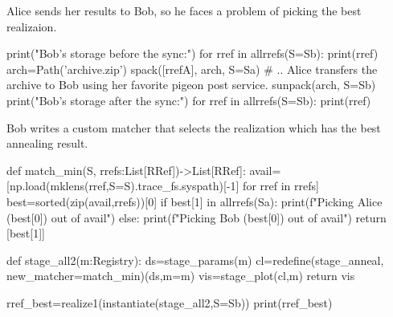 Alice sends her results to Bob, so he faces a problem of picking the best
realizaion.

\begin{pythontexcode}
print("Bob's storage before the sync:")
for rref in allrrefs(S=Sb):
  print(rref)
arch=Path('archive.zip')
spack([rrefA], arch, S=Sa)
# .. Alice transfers the archive to Bob using her favorite pigeon post service.
sunpack(arch, S=Sb)
print("Bob's storage after the sync:")
for rref in allrrefs(S=Sb):
  print(rref)
\end{pythontexcode}

\mystdout


Bob writes a custom matcher that selects the realization which has the best
annealing result.

\begin{pythontexcode}
def match_min(S, rrefs:List[RRef])->List[RRef]:
  avail=[np.load(mklens(rref,S=S).trace_fs.syspath)[-1] for rref in rrefs]
  best=sorted(zip(avail,rrefs))[0]
  if best[1] in allrrefs(Sa):
    print(f"Picking Alice ({best[0]}) out of {avail}")
  else:
    print(f"Picking Bob ({best[0]}) out of {avail}")
  return [best[1]]

def stage_all2(m:Registry):
  ds=stage_params(m)
  cl=redefine(stage_anneal, new_matcher=match_min)(ds,m=m)
  vis=stage_plot(cl,m)
  return vis

rref_best=realize1(instantiate(stage_all2,S=Sb))
print(rref_best)
\end{pythontexcode}

\mystdout
